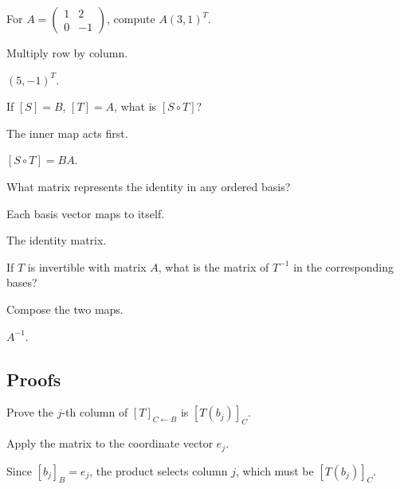 \begin{exercise}\label{exr:i07-expand-02}
For \(A=\begin{pmatrix}1&2\\0&-1\end{pmatrix}\), compute \(A(3,1)^T\).
\end{exercise}
\begin{hint}
Multiply row by column.
\end{hint}
\begin{solution}
\((5,-1)^T\).
\end{solution}

\begin{exercise}\label{exr:i07-expand-03}
If \([S]=B\), \([T]=A\), what is \([S\circ T]\)?
\end{exercise}
\begin{hint}
The inner map acts first.
\end{hint}
\begin{solution}
\([S\circ T]=BA\).
\end{solution}

\begin{exercise}\label{exr:i07-expand-04}
What matrix represents the identity in any ordered basis?
\end{exercise}
\begin{hint}
Each basis vector maps to itself.
\end{hint}
\begin{solution}
The identity matrix.
\end{solution}

\begin{exercise}\label{exr:i07-expand-05}
If \(T\) is invertible with matrix \(A\), what is the matrix of \(T^{-1}\) in the corresponding bases?
\end{exercise}
\begin{hint}
Compose the two maps.
\end{hint}
\begin{solution}
\(A^{-1}\).
\end{solution}

\subsection*{Proofs}

\begin{exercise}\label{exr:i07-expand-06}
Prove the \(j\)-th column of \([T]_{C\leftarrow B}\) is \([T(b_j)]_C\).
\end{exercise}
\begin{hint}
Apply the matrix to the coordinate vector \(e_j\).
\end{hint}
\begin{solution}
Since \([b_j]_B=e_j\), the product selects column \(j\), which must be \([T(b_j)]_C\).
\end{solution}

